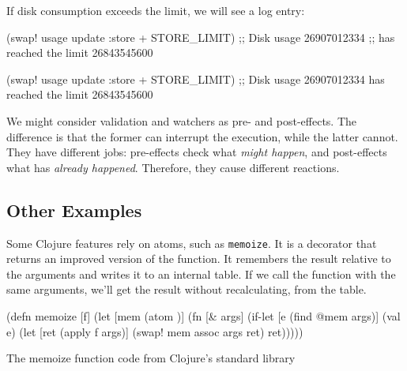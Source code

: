 \fi

\noindent
If disk consumption exceeds the limit, we will see a log entry:

\ifx\DEVICETYPE\MOBILE

\begin{clojure}
(swap! usage update :store + STORE_LIMIT)
;; Disk usage 26907012334
;; has reached the limit 26843545600
\end{clojure}

\else

\begin{clojure}
(swap! usage update :store + STORE_LIMIT)
;; Disk usage 26907012334 has reached the limit 26843545600
\end{clojure}

\fi

We might consider validation and watchers as pre- and post-effects.
The difference is that the former can interrupt the execution, while the latter cannot.
They have different jobs: pre-effects check what \emph{might happen}, and post-effects what has \emph {already happened}.
Therefore, they cause different reactions.

\subsection{Other Examples}


Some Clojure features rely on atoms, such as \verb|memoize|.
It is a decorator that returns an improved version of the function.
It remembers the result relative to the arguments and writes it to an internal table.
If we call the function with the same arguments, we'll get the result without recalculating, from the table.

\begin{listing}[ht!]

\begin{clojure}
(defn memoize [f]
  (let [mem (atom {})]
    (fn [& args]
      (if-let [e (find @mem args)]
        (val e)
        (let [ret (apply f args)]
          (swap! mem assoc args ret)
          ret)))))
\end{clojure}

\caption{The memoize function code from Clojure's standard library}
\label{fig:clj-memoize}

\end{listing}


